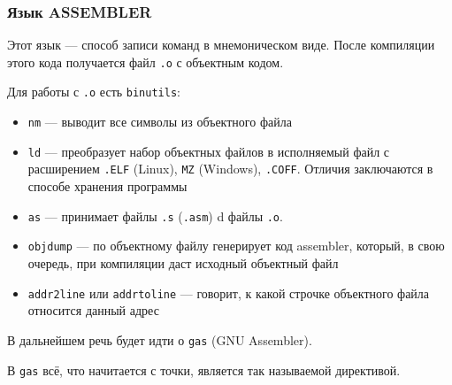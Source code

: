 \subsubsection*{Язык ASSEMBLER}
Этот язык --- способ записи команд в мнемоническом виде. После компиляции этого кода получается файл \verb!.o! с объектным кодом.

Для работы с \verb!.o! есть \verb!binutils!:
\begin{itemize}
\item \verb!nm! --- выводит все символы из объектного файла
\item \verb!ld! --- преобразует набор объектных файлов в исполняемый файл с расширением \verb!.ELF! (Linux), \verb!MZ! (Windows), \verb!.COFF!. Отличия заключаются в способе хранения программы
\item \verb!as! --- принимает файлы \verb!.s! (\verb!.asm!) d файлы \verb!.o!.
\item \verb!objdump! --- по объектному файлу генерирует код assembler, который, в свою очередь, при компиляции даст исходный объектный файл
\item \verb!addr2line! или \verb!addrtoline! --- говорит, к какой строчке объектного файла относится данный адрес
\end{itemize}

В дальнейшем речь будет идти о \verb!gas! (GNU Assembler).

В \verb!gas! всё, что начитается с точки, является так называемой директивой.


